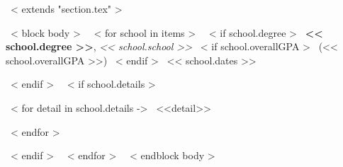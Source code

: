 ~< extends "section.tex" >~

~< block body >~
~< for school in items >~
  ~< if school.degree >~
    \textbf{<< school.degree >>}, \emph{<< school.school >>}
    ~< if school.overallGPA >~
        (<< school.overallGPA >>)
    ~< endif >~
    \hfill << school.dates >> \par
  ~< endif >~
  ~< if school.details >~
   {\footnotesize \color{gray}
    ~< for detail in school.details ->~
        <<detail>> \par
    ~< endfor >~
   }
  ~< endif >~
  \vspace{1mm}
~< endfor >~
\vspace{-3mm}
~< endblock body >~
